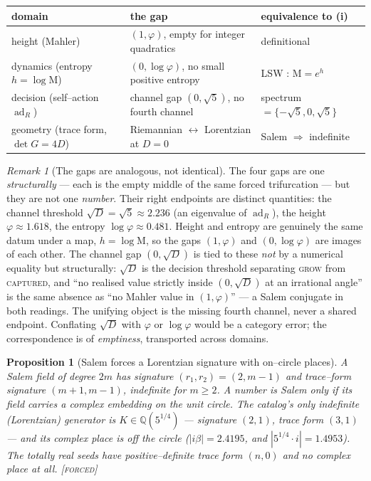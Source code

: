 \documentclass[11pt]{article}
\theoremstyle{plain}
\newtheorem{proposition}[theorem]{Proposition}
\theoremstyle{definition}
\theoremstyle{remark}
\newtheorem{remark}[theorem]{Remark}
\newcommand{\forced}{\textcolor{forcedc}{\textsc{[forced]}}}
\newcommand{\Q}{\mathbb{Q}}
\newcommand{\Mah}{\mathrm{M}}
\newcommand{\abs}[1]{\left\lvert #1 \right\rvert}
\begin{document}
\begin{center}
\renewcommand{\arraystretch}{1.3}
\begin{tabular}{@{}lll@{}}
\toprule
domain & the gap & equivalence to (i) \\
\midrule
height (Mahler) & $(1,\varphi)$, empty for integer quadratics & definitional \\
dynamics (entropy $h=\log\Mah$) & $(0,\log\varphi)$, no small positive entropy & LSW \cite{LSW}: $\Mah=e^{h}$ \\
decision (self--action $\operatorname{ad}_R$) & channel gap $(0,\sqrt5)$, no fourth channel & spectrum $=\{-\sqrt5,0,\sqrt5\}$ \\
geometry (trace form, $\det G=4D$) & Riemannian $\leftrightarrow$ Lorentzian at $D=0$ & Salem $\Rightarrow$ indefinite \\
\bottomrule
\end{tabular}
\end{center}

\begin{remark}[The gaps are analogous, not identical]\label{rem:analogous}
The four gaps are one \emph{structurally} --- each is the empty middle of the same forced trifurcation --- but they are not one \emph{number}. Their right endpoints are distinct quantities: the channel threshold $\sqrt D=\sqrt5\approx2.236$ (an eigenvalue of $\operatorname{ad}_R$), the height $\varphi\approx1.618$, the entropy $\log\varphi\approx0.481$. Height and entropy are genuinely the same datum under a map, $h=\log\Mah$, so the gaps $(1,\varphi)$ and $(0,\log\varphi)$ are images of each other. The channel gap $(0,\sqrt D)$ is tied to these \emph{not} by a numerical equality but structurally: $\sqrt D$ is the decision threshold separating \textsc{grow} from \textsc{captured}, and ``no realised value strictly inside $(0,\sqrt D)$ at an irrational angle'' is the same absence as ``no Mahler value in $(1,\varphi)$'' --- a Salem conjugate in both readings. The unifying object is the missing fourth channel, never a shared endpoint. Conflating $\sqrt D$ with $\varphi$ or $\log\varphi$ would be a category error; the correspondence is of \emph{emptiness}, transported across domains.
\end{remark}

\begin{proposition}[Salem forces a Lorentzian signature with on--circle places]\label{prop:lorentz}
A Salem field of degree $2m$ has signature $(r_1,r_2)=(2,m-1)$ and trace--form signature $(m+1,m-1)$, indefinite for $m\ge2$. A number is Salem only if its field carries a complex embedding \emph{on} the unit circle. The catalog's only indefinite (Lorentzian) generator is $K\in\Q(5^{1/4})$ --- signature $(2,1)$, trace form $(3,1)$ --- and its complex place is \emph{off} the circle ($\abs{i\beta}=2.4195$, and $\abs{5^{1/4}\!\cdot i}=1.4953$). The totally real seeds have positive--definite trace form $(n,0)$ and no complex place at all. \forced
\end{proposition}
\end{document}
